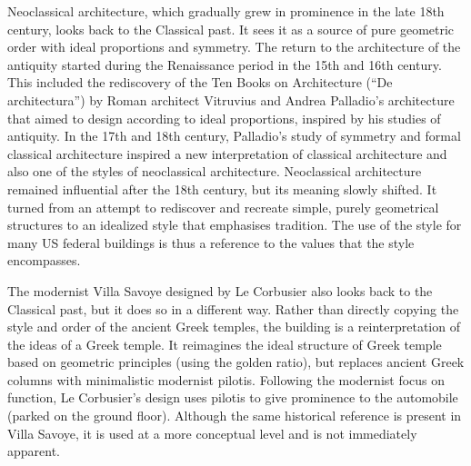 Neoclassical architecture, which gradually grew in prominence in the late 18th century, looks
back to the Classical past. It sees it as a source of pure geometric order with ideal proportions
and symmetry. The return to the architecture of the antiquity started during the Renaissance
period in the 15th and 16th century. This included the rediscovery of the Ten Books on Architecture
(``De architectura'') by Roman architect Vitruvius and Andrea Palladio's architecture that aimed
to design according to ideal proportions, inspired by his studies of antiquity. In the 17th and
18th century, Palladio's study of symmetry and formal classical architecture inspired a new
interpretation of classical architecture and also one of the styles of neoclassical
architecture.
Neoclassical architecture remained influential after the 18th century, but its meaning
slowly shifted. It turned from an attempt to rediscover and recreate simple, purely geometrical
structures to an idealized style that emphasises tradition. The use of the style for many US federal
buildings is thus a reference to the values that the style encompasses.

The modernist Villa Savoye designed by Le Corbusier also looks back to the Classical past,
but it does so in a different way. Rather than directly copying the style and order of the
ancient Greek temples, the building is a reinterpretation of the ideas of a Greek
temple.
It reimagines the ideal structure of Greek temple based on geometric principles (using the golden
ratio), but replaces ancient Greek columns with minimalistic modernist pilotis. Following the
modernist focus on function, Le Corbusier's design uses pilotis to give prominence to the
automobile (parked on the ground floor). Although the same historical reference is present in Villa
Savoye, it is used at a more conceptual level and is not immediately apparent.

